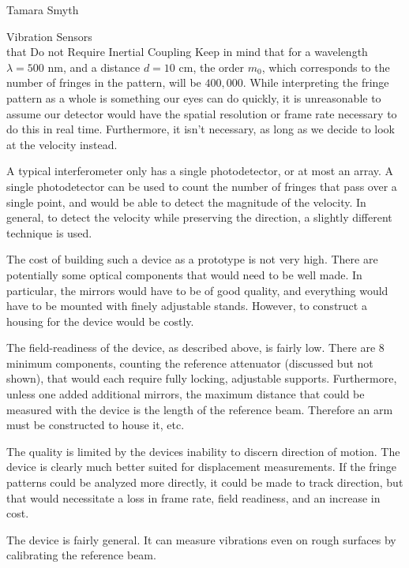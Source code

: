 \documentclass[a4paper,10pt]{report}
\numberwithin{equation}{section}
\begin{document}
\begin{chapter}{Tamara Smyth}
\begin{section}{Vibration Sensors \\that Do not Require Inertial Coupling}
Keep in mind that for a wavelength $\lambda=500$ nm, and a distance $d = 10$ cm, the order $m_0$, which corresponds to the number of fringes in the pattern, will be $400,000$.
While interpreting the fringe pattern as a whole is something our eyes can do quickly, it is unreasonable to assume our detector would have the spatial resolution or frame rate necessary to do this in real time. Furthermore, it isn't necessary, as long as we decide to look at the velocity instead. 

A typical interferometer only has a single photodetector, or at most an array. A single photodetector can be used to count the number of fringes that pass over a single point, and would be able to detect the magnitude of the velocity. In general, to detect the velocity while preserving the direction, a slightly different technique is used.\cite[p.~241]{Baker1990}

The cost of building such a device as a prototype is not very high. There are potentially some optical components that would need to be well made. In particular, the mirrors would have to be of good quality, and everything would have to be mounted with finely adjustable stands. However, to construct a housing for the device would be costly.

The field-readiness of the device, as described above, is fairly low. There are 8 minimum components, counting the reference attenuator (discussed but not shown), that would each require fully locking, adjustable supports. Furthermore, unless one added additional mirrors, the maximum distance that could be measured with the device is the length of the reference beam. Therefore an arm must be constructed to house it, etc.

The quality is limited by the devices inability to discern direction of motion. The device is clearly much better suited for displacement measurements. If the fringe patterns could be analyzed more directly, it could be made to track direction, but that would necessitate a loss in frame rate, field readiness, and an increase in cost.

The device is fairly general. It can measure vibrations even on rough surfaces by calibrating the reference beam.

\end{section}
\end{chapter}
\end{document}
